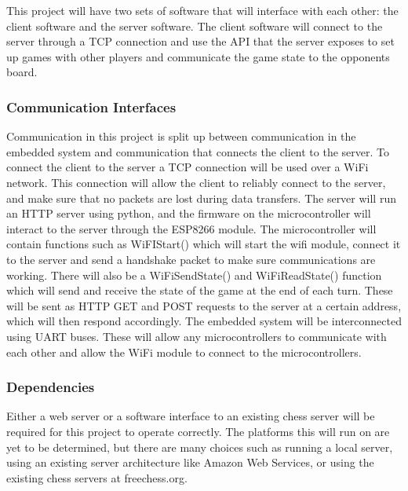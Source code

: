 \documentclass{article}
\begin{document}
This project will have two sets of software that will interface with each other: the client software and the server software. The client software will connect to the server through a TCP connection and use the API that the server exposes to set up games with other players and communicate the game state to the opponents board.

\subsubsection*{Communication Interfaces}
\indent

Communication in this project is split up between communication in the embedded system and communication that connects the client to the server. To connect the client to the server a TCP connection will be used over a WiFi network. This connection will allow the client to reliably connect to the server, and make sure that no packets are lost during data transfers. The server will run an HTTP server using python, and the firmware on the microcontroller will interact to the server through the ESP8266 module. The microcontroller will contain functions such as WiFIStart() which will start the wifi module, connect it to the server and send a handshake packet to make sure communications are working. There will also be a WiFiSendState() and WiFiReadState() function which will send and receive the state of the game at the end of each turn. These will be sent as HTTP GET and POST requests to the server at a certain address, which will then respond accordingly. The embedded system will be interconnected using UART buses. These will allow any microcontrollers to communicate with each other and allow the WiFi module to connect to the microcontrollers.

\subsubsection*{Dependencies}
\indent

Either a web server or a software interface to an existing chess server will be required for this project to operate correctly. The platforms this will run on are yet to be determined, but there are many choices such as running a local server, using an existing server architecture like Amazon Web Services, or using the existing chess servers at freechess.org.
\end{document}
